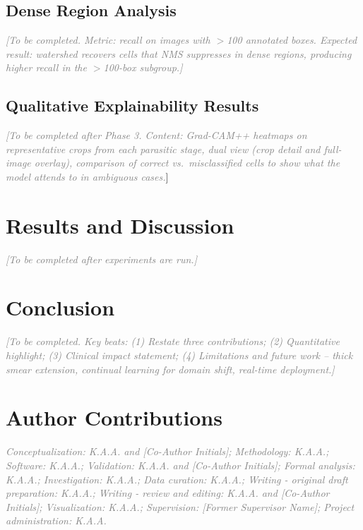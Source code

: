 \documentclass[10pt,twocolumn]{article}
\newcommand{\placeholder}[1]{\textcolor{gray}{\textit{#1}}}
\begin{document}
\subsection{Dense Region Analysis}
\label{ssec:dense}
\placeholder{[To be completed. Metric: recall on images with $>$100
annotated boxes. Expected result: watershed recovers cells that NMS
suppresses in dense regions, producing higher recall in the
$>$100-box subgroup.]}

\subsection{Qualitative Explainability Results}
\label{ssec:xai_results}
\placeholder{[To be completed after Phase 3. Content: Grad-CAM++ heatmaps
on representative crops from each parasitic stage, dual view (crop
detail and full-image overlay), comparison of correct vs.\ misclassified
cells to show what the model attends to in ambiguous cases.}]

\section{Results and Discussion}
\label{sec:results}

\placeholder{[To be completed after experiments are run.]}

\section{Conclusion}
\label{sec:conclusion}

\placeholder{[To be completed. Key beats: (1) Restate three contributions;
(2) Quantitative highlight; (3) Clinical impact statement;
(4) Limitations and future work -- thick smear extension, continual
learning for domain shift, real-time deployment.]}

\section*{Author Contributions}
\placeholder{Conceptualization: K.A.A. and [Co-Author Initials]; Methodology: K.A.A.; Software: K.A.A.; 
Validation: K.A.A. and [Co-Author Initials]; Formal analysis: K.A.A.; Investigation: K.A.A.; 
Data curation: K.A.A.; Writing - original draft preparation: K.A.A.; 
Writing - review and editing: K.A.A. and [Co-Author Initials]; Visualization: K.A.A.; 
Supervision: [Former Supervisor Name]; Project administration: K.A.A.}
\end{document}
